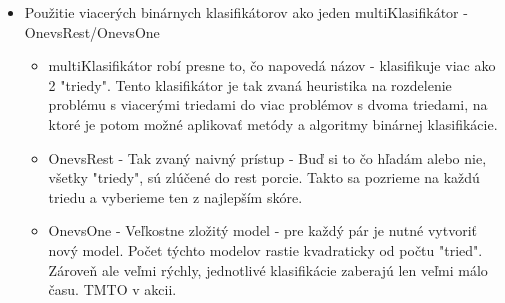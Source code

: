\documentclass{article}
\begin{document}
\begin{itemize}
\begin{itemize}
        \end{itemize}
    
    \begin{itemize}
    
    \end{itemize}
    
    \item Použitie viacerých binárnych klasifikátorov ako jeden multiKlasifikátor - OnevsRest/OnevsOne
    \begin{itemize}
        \item multiKlasifikátor robí presne to, čo napovedá názov - klasifikuje viac ako 2 "triedy". Tento klasifikátor je tak zvaná heuristika na rozdelenie problému s viacerými triedami do viac problémov s dvoma triedami, na ktoré je potom možné aplikovať metódy a algoritmy binárnej klasifikácie.
        \item OnevsRest - Tak zvaný naivný prístup - Buď si to čo hľadám alebo nie, všetky "triedy", sú zlúčené do rest porcie. Takto sa pozrieme na každú triedu a vyberieme ten z najlepším skóre. 
        \item OnevsOne - Veľkostne zložitý model - pre každý pár je nutné vytvoriť nový model. Počet týchto modelov rastie kvadraticky od počtu "tried". Zároveň ale veľmi rýchly, jednotlivé klasifikácie zaberajú len veľmi málo času. TMTO v akcii.
    \end{itemize}
\end{itemize}
\end{document}
